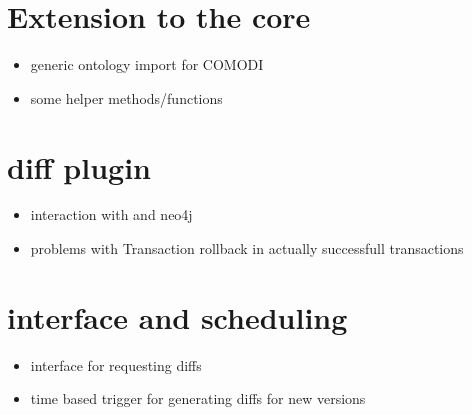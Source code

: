 
\section{\modelcrawler}
	\label{sec:impl:modelcrawler}

\section{Extension to the \masymos core}
	\label{sec:impl:masymos}
	\begin{itemize}
		\item generic ontology import for COMODI
		\item some helper methods/functions
	\end{itemize}

\section{\masymos diff plugin}
	\label{sec:impl:diff}
	\begin{itemize}
		\item interaction with \bives and neo4j
		\item problems with Transaction rollback in actually successfull transactions
	\end{itemize}

\section{\rest interface and scheduling}
	\label{sec:impl:rest}
	\begin{itemize}
		\item \rest interface for requesting diffs
		\item time based trigger for generating diffs for new versions
	\end{itemize}

